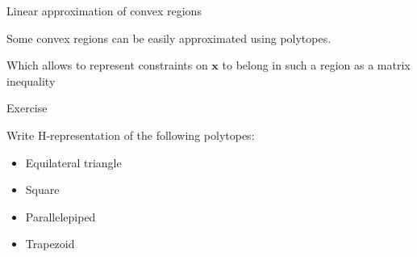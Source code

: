 \documentclass{beamer}
\begin{document}
\begin{frame}{Linear approximation of convex regions}
\begin{flushleft}
Some convex regions can be easily approximated using polytopes.



Which allows to represent constraints on $\mathbf{x}$ to belong in such a region as a matrix inequality
 
\end{flushleft}
\end{frame}



\begin{frame}{Exercise}
\begin{flushleft}

Write H-representation of the following polytopes:

\begin{itemize}
    \item Equilateral triangle
    \item Square
    \item Parallelepiped
    \item Trapezoid
\end{itemize}

\end{flushleft}
\end{frame}





\myqrframe
\end{document}
